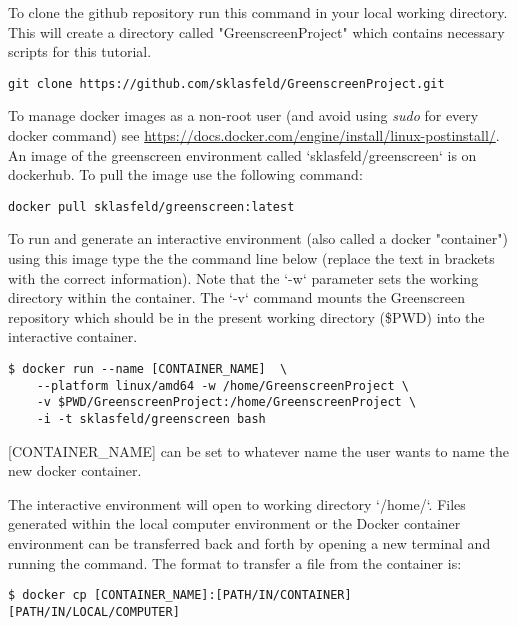 \documentclass{article}
\begin{document}
\begin{sloppypar}
To clone the github repository run this command in your local working directory. This will create a directory called "GreenscreenProject" which contains necessary scripts for this tutorial.

\begin{verbatim}
git clone https://github.com/sklasfeld/GreenscreenProject.git
\end{verbatim}

To manage docker images as a non-root user (and avoid using \emph{sudo} for every docker command) see \url{https://docs.docker.com/engine/install/linux-postinstall/}. An image of the greenscreen environment called `sklasfeld/greenscreen` is on dockerhub. To pull the image use the following command:

\begin{verbatim}
docker pull sklasfeld/greenscreen:latest
\end{verbatim}

To run and generate an interactive environment (also called a docker "container") using this image type the the command line below (replace the text in brackets with the correct information). Note that the `-w` parameter sets the working directory within the container. The `-v` command mounts the Greenscreen repository which should be in the present working directory (\$PWD) into the interactive container.

\begin{verbatim}
$ docker run --name [CONTAINER_NAME]  \
    --platform linux/amd64 -w /home/GreenscreenProject \
    -v $PWD/GreenscreenProject:/home/GreenscreenProject \
    -i -t sklasfeld/greenscreen bash
\end{verbatim}

[CONTAINER\_NAME] can be set to whatever name the user wants to name the new docker container.

The interactive environment will open to working directory `/home/`. Files generated within the local computer environment or the Docker container environment can be transferred back and forth by opening a new terminal and running the  command. The format to transfer a file from the container is:

\begin{verbatim}
$ docker cp [CONTAINER_NAME]:[PATH/IN/CONTAINER] [PATH/IN/LOCAL/COMPUTER]
\end{verbatim}


\end{sloppypar}
\end{document}
